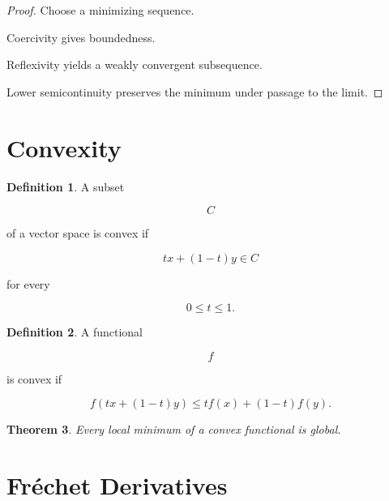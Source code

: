 \documentclass[11pt]{book}
\numberwithin{equation}{chapter}
\theoremstyle{definition}
\newtheorem{definition}{Definition}[chapter]
\theoremstyle{plain}
\newtheorem{theorem}[definition]{Theorem}
\begin{document}
\begin{proof}

Choose a minimizing sequence.

Coercivity gives boundedness.

Reflexivity yields a weakly convergent subsequence.

Lower semicontinuity preserves the minimum under passage to the limit.

\end{proof}


\section{Convexity}

\begin{definition}

A subset

\[
C
\]

of a vector space is convex if

\[
tx+(1-t)y
\in C
\]

for every

\[
0\le t\le1.
\]

\end{definition}


\begin{definition}

A functional

\[
f
\]

is convex if

\[
f(tx+(1-t)y)
\le
tf(x)+(1-t)f(y).
\]

\end{definition}


\begin{theorem}

Every local minimum of a convex functional is global.

\end{theorem}


\section{Fréchet Derivatives}
\end{document}
